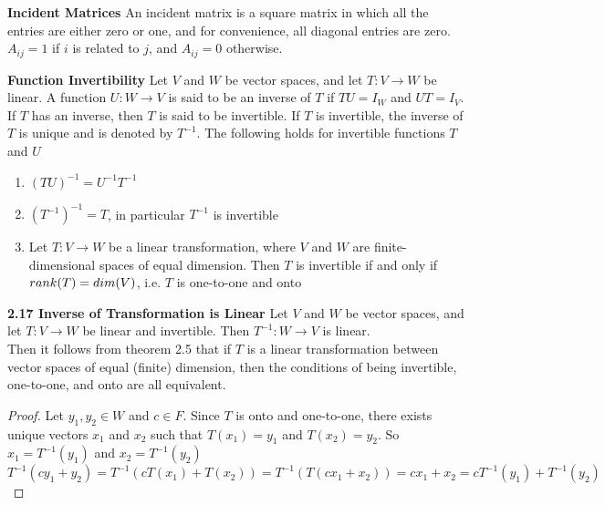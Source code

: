\documentclass[11pt]{article}
\begin{document}
\begin{defn*}
    \textbf{Incident Matrices} An incident matrix is a square matrix in which all the entries are either zero or one, and for convenience, all diagonal entries are zero. $A_{ij}=1$ if $i$ is related to $j$, and $A_{ij}=0$ otherwise. 
\end{defn*}



\begin{defn*}
    \textbf{Function Invertibility} Let $V$ and $W$ be vector spaces, and let $T:V\to W$ be linear. A function $U:W\to V$ is said to be an inverse of $T$ if $TU = I_W$ and $UT = I_V$. If $T$ has an inverse, then $T$ is said to be invertible. If $T$ is invertible, the inverse of $T$ is unique and is denoted by $T^{-1}$. The following holds for invertible functions $T$ and $U$
    \begin{enumerate}
        \item $(TU)^{-1} = U^{-1} T^{-1}$ 
        \item $(T^{-1})^{-1} = T$, in particular $T^{-1}$ is invertible 
        \item Let $T:V\to W$ be a linear transformation, where $V$ and $W$ are finite-dimensional spaces of equal dimension. Then $T$ is invertible if and only if $rank(T) = dim(V)$, i.e. $T$ is one-to-one and onto
    \end{enumerate}
\end{defn*}


\begin{theorem*}
    \textbf{2.17 Inverse of Transformation is Linear} Let $V$ and $W$ be vector spaces, and let $T:V\to W$ be linear and invertible. Then $T^{-1} : W\to V$ is linear. \\ 
    Then it follows from theorem 2.5 that if $T$ is a linear transformation between vector spaces of equal (finite) dimension, then the conditions of being invertible, one-to-one, and onto are all equivalent. 
    \begin{proof}
        Let $y_1,y_2\in W$ and $c\in F$. Since $T$ is onto and one-to-one, there exists unique vectors $x_1$ and $x_2$ such that $T(x_1) = y_1$ and $T(x_2) = y_2$. So $x_1 = T^{-1}(y_1)$ and $x_2 = T^{-1}(y_2)$
        \[
            T^{-1}(cy_1 + y_2) = T^{-1}(cT(x_1) + T(x_2)) = T^{-1}(T(cx_1 + x_2)) = cx_1 + x_2 
            = cT^{-1}(y_1) + T^{-1}(y_2)
        \]
    \end{proof}
\end{theorem*}
\end{document}
